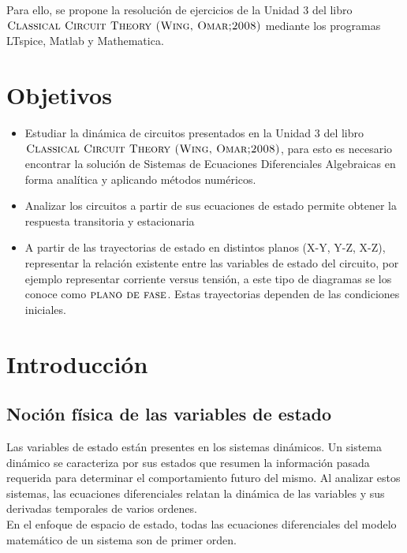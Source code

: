 \documentclass[10pt,a4paper]{article} %
\begin{document}
	Para ello, se propone la resolución de ejercicios de la Unidad 3 del libro  $\textsc{Classical Circuit Theory (Wing, Omar;2008)}$ mediante los programas LTspice, Matlab y Mathematica.  \\
	
	
	\newpage
	
	\tableofcontents
	\newpage
	\section{Objetivos}
	\begin{itemize}
		\item Estudiar la dinámica de circuitos presentados en la Unidad 3 del libro $\textsc{Classical Circuit Theory (Wing, Omar;2008)}$, para esto es necesario encontrar la solución de Sistemas de Ecuaciones Diferenciales Algebraicas en forma analítica y aplicando métodos numéricos.
		
		\item Analizar los circuitos a partir de sus ecuaciones de estado permite obtener la respuesta transitoria y estacionaria
		
		\item A partir de las trayectorias de estado en distintos planos (X-Y, Y-Z, X-Z), representar la relación existente entre las variables de estado del circuito, por ejemplo representar corriente versus tensión, a este tipo de diagramas se los conoce como $\textsc{plano de fase}$. Estas trayectorias dependen de las condiciones iniciales.	
	\end{itemize}
	
	\section{Introducción}
	
	\subsection{Noción física de las variables de estado}
	
	Las variables de estado están presentes en los sistemas dinámicos. Un sistema dinámico se caracteriza por sus estados que resumen la información pasada requerida para determinar el comportamiento futuro del mismo. Al analizar estos sistemas, las ecuaciones diferenciales relatan la dinámica de las variables y sus derivadas temporales de varios ordenes. \\
	
	En el enfoque de espacio de estado, todas las ecuaciones diferenciales del modelo matemático de un sistema son de primer orden.\\
	
\end{document}
